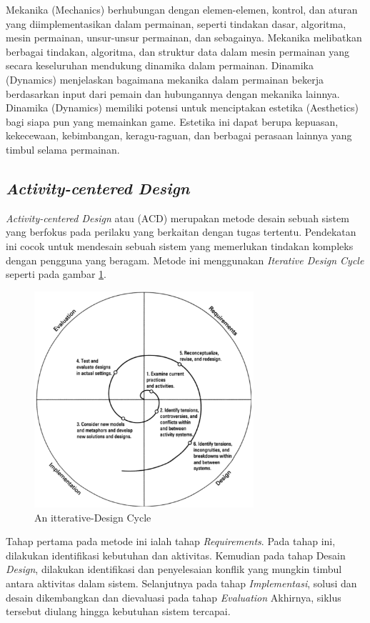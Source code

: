 Mekanika (Mechanics) berhubungan dengan elemen-elemen, kontrol, dan aturan yang diimplementasikan dalam permainan, seperti tindakan dasar, algoritma, mesin permainan, unsur-unsur permainan, dan sebagainya.
Mekanika melibatkan berbagai tindakan, algoritma, dan struktur data dalam mesin permainan yang secara keseluruhan mendukung dinamika dalam permainan.
Dinamika (Dynamics) menjelaskan bagaimana mekanika dalam permainan bekerja berdasarkan input dari pemain dan hubungannya dengan mekanika lainnya.
Dinamika (Dynamics) memiliki potensi untuk menciptakan estetika (Aesthetics) bagi siapa pun yang memainkan game. Estetika ini dapat berupa kepuasan, kekecewaan, kebimbangan, keragu-raguan, dan berbagai perasaan lainnya yang timbul selama permainan.
\subsection{\textit{Activity-centered Design}}
\textit{Activity-centered Design} atau (ACD) merupakan metode desain sebuah sistem yang berfokus pada perilaku yang berkaitan dengan tugas tertentu.
Pendekatan ini cocok untuk mendesain sebuah sistem yang memerlukan tindakan kompleks dengan pengguna yang beragam. Metode ini menggunakan \textit{Iterative Design Cycle} seperti pada gambar \ref*{Fig:itterative-Design Cycle}.
\begin{figure}[H]
	\centering
	\includegraphics[height=8cm]{contents/chapter-2/images/Itterative-design.png}
	\caption[Caption]{An itterative-Design Cycle \cite{2004activity}}
	\label{Fig:itterative-Design Cycle}
\end{figure}
Tahap pertama pada metode ini ialah tahap \textit{Requirements}. Pada tahap ini, dilakukan identifikasi kebutuhan dan aktivitas. 
Kemudian pada tahap Desain \textit{Design}, dilakukan identifikasi dan penyelesaian konflik yang mungkin timbul antara aktivitas dalam sistem.
Selanjutnya pada tahap \textit{Implementasi}, solusi dan desain dikembangkan dan dievaluasi pada tahap \textit{Evaluation}
Akhirnya, siklus tersebut diulang hingga kebutuhan sistem tercapai.
